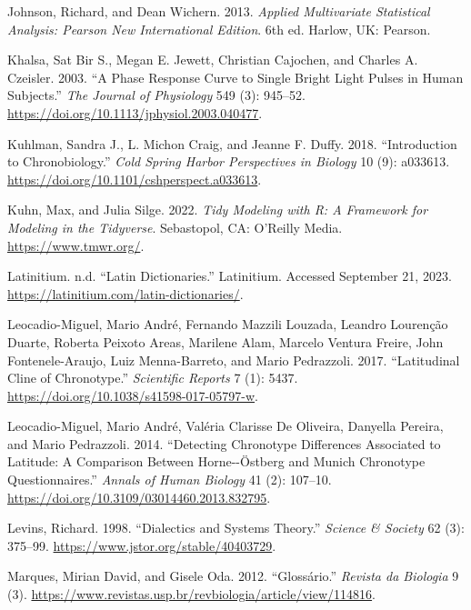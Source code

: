 \documentclass[
  12pt,
  a4paper,
  oneside]{tesesusp}
\newlength{\cslhangindent}
\newlength{\cslentryspacingunit} %
\newenvironment{CSLReferences}[2] %
 {%
  \setlength{\parindent}{0pt}
  \ifodd #1
  \let\oldpar\par
  \def\par{\hangindent=\cslhangindent\oldpar}
  \fi
  \setlength{\parskip}{#2\cslentryspacingunit}
 }%
 {}
\begin{document}
\begin{CSLReferences}{1}{0}
\leavevmode{}%
Johnson, Richard, and Dean Wichern. 2013. \emph{Applied Multivariate
Statistical Analysis: Pearson New International Edition}. 6th ed.
Harlow, UK: Pearson.

\leavevmode{}%
Khalsa, Sat Bir S., Megan E. Jewett, Christian Cajochen, and Charles A.
Czeisler. 2003. {``A Phase Response Curve to Single Bright Light Pulses
in Human Subjects.''} \emph{The Journal of Physiology} 549 (3): 945--52.
\url{https://doi.org/10.1113/jphysiol.2003.040477}.

\leavevmode{}%
Kuhlman, Sandra J., L. Michon Craig, and Jeanne F. Duffy. 2018.
{``Introduction to Chronobiology.''} \emph{Cold Spring Harbor
Perspectives in Biology} 10 (9): a033613.
\url{https://doi.org/10.1101/cshperspect.a033613}.

\leavevmode{}%
Kuhn, Max, and Julia Silge. 2022. \emph{Tidy Modeling with R: A
Framework for Modeling in the Tidyverse}. Sebastopol, CA: O'Reilly
Media. \url{https://www.tmwr.org/}.

\leavevmode{}%
Latinitium. n.d. {``Latin Dictionaries.''} Latinitium. Accessed
September 21, 2023. \url{https://latinitium.com/latin-dictionaries/}.

\leavevmode{}%
Leocadio-Miguel, Mario André, Fernando Mazzili Louzada, Leandro
Lourenção Duarte, Roberta Peixoto Areas, Marilene Alam, Marcelo Ventura
Freire, John Fontenele-Araujo, Luiz Menna-Barreto, and Mario Pedrazzoli.
2017. {``Latitudinal Cline of Chronotype.''} \emph{Scientific Reports} 7
(1): 5437. \url{https://doi.org/10.1038/s41598-017-05797-w}.

\leavevmode{}%
Leocadio-Miguel, Mario André, Valéria Clarisse De Oliveira, Danyella
Pereira, and Mario Pedrazzoli. 2014. {``Detecting Chronotype Differences
Associated to Latitude: A Comparison Between Horne-\/-Östberg and Munich
Chronotype Questionnaires.''} \emph{Annals of Human Biology} 41 (2):
107--10. \url{https://doi.org/10.3109/03014460.2013.832795}.

\leavevmode{}%
Levins, Richard. 1998. {``Dialectics and Systems Theory.''}
\emph{Science \& Society} 62 (3): 375--99.
\url{https://www.jstor.org/stable/40403729}.

\leavevmode{}%
Marques, Mirian David, and Gisele Oda. 2012. {``Glossário.''}
\emph{Revista da Biologia} 9 (3).
\url{https://www.revistas.usp.br/revbiologia/article/view/114816}.


\end{CSLReferences}
\end{document}

